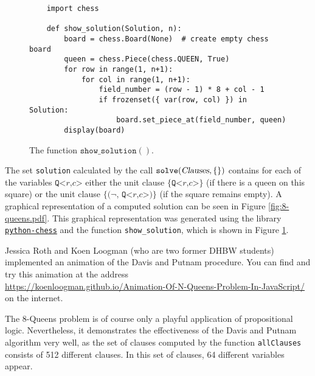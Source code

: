 \begin{figure}[!ht]
\centering
\begin{verbatim}
    import chess
                
    def show_solution(Solution, n):
        board = chess.Board(None)  # create empty chess board
        queen = chess.Piece(chess.QUEEN, True)
        for row in range(1, n+1):
            for col in range(1, n+1):
                field_number = (row - 1) * 8 + col - 1
                if frozenset({ var(row, col) }) in Solution:
                    board.set_piece_at(field_number, queen)
        display(board)        
\end{verbatim}
\vspace*{-0.3cm}
\caption{The function $\texttt{show\_solution}()$.}
\label{fig:printBoard}
\end{figure}

The set \texttt{solution} calculated by the call $\texttt{solve}(\textsl{Clauses}, \{\})$ contains for each of the variables $\texttt{Q<}r\texttt{,}c\texttt{>}$
either the unit clause $\{\texttt{Q<}r\texttt{,}c\texttt{>}\}$ (if there is a queen on this square) or
the unit clause $\{ \texttt{(¬, Q<}r\texttt{,}c\texttt{>)}\}$ (if the square remains empty).
A graphical representation of a computed solution can be seen in Figure \ref{fig:8-queens.pdf}.
This graphical representation was generated using the library
\href{https://python-chess.readthedocs.io/en/latest/}{\texttt{python-chess}} and the function
\texttt{show\_solution}, which is shown in Figure \ref{fig:printBoard}.

Jessica Roth and Koen Loogman (who are two former DHBW students) implemented an animation of the Davis and Putnam procedure. You can find and try this animation at the address
\\[0.2cm]
\hspace*{1.3cm}
\href{https://koenloogman.github.io/Animation-Of-N-Queens-Problem-In-JavaScript/}{https://koenloogman.github.io/Animation-Of-N-Queens-Problem-In-JavaScript/}
\\[0.2cm]
on the internet.

The 8-Queens problem is of course only a playful application of propositional logic.
Nevertheless, it demonstrates the effectiveness of the Davis and Putnam algorithm very well, as the set of clauses computed by the function \texttt{allClauses}
consists of 512 different clauses. In this set of clauses, 64 different
variables appear.

